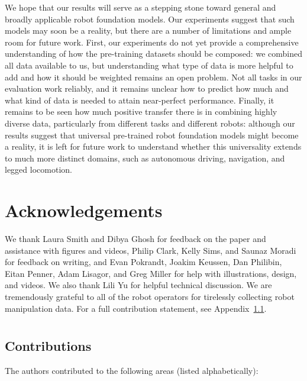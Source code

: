 We hope that our results will serve as a stepping stone toward general and broadly applicable robot foundation models. Our experiments suggest that such models may soon be a reality, but there are a number of limitations and ample room for future work. First, our experiments do not yet provide a comprehensive understanding of how the pre-training datasets should be composed: we combined all data available to us, but understanding what type of data is more helpful to add and how it should be weighted remains an open problem. Not all tasks in our evaluation work reliably, and it remains unclear how to predict how much and what kind of data is needed to attain near-perfect performance. Finally, it remains to be seen how much positive transfer there is in combining highly diverse data, particularly from different tasks and different robots: although our results suggest that universal pre-trained robot foundation models might become a reality, it is left for future work to understand whether this universality extends to much more distinct domains, such as autonomous driving, navigation, and legged locomotion.

\section*{Acknowledgements}

We thank Laura Smith and Dibya Ghosh for feedback on the paper and assistance with figures and videos, Philip Clark, Kelly Sims, and Saunaz Moradi for feedback on writing, and Evan Pokrandt, Joakim Keussen, Dan Philibin, Eitan Penner, Adam Lisagor, and Greg Miller for help with illustrations, design, and videos. We also thank Lili Yu for helpful technical discussion. We are tremendously grateful to all of the robot operators for tirelessly collecting robot manipulation data. For a full contribution statement, see Appendix~\ref{app:contributions}.

\appendix

\section{}

\subsection{Contributions}
\label{app:contributions}

The authors contributed to the following areas (listed alphabetically):


